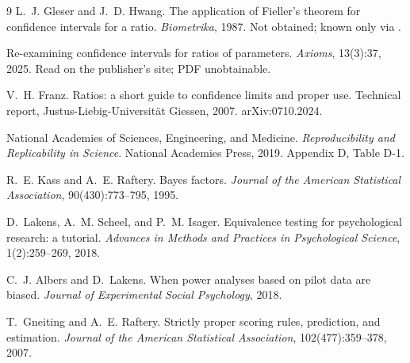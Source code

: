 \documentclass[10pt,twocolumn,letterpaper]{article}
\begin{document}
\begin{thebibliography}{9}
L.~J. Gleser and J.~D. Hwang.
The application of Fieller's theorem for confidence intervals for a ratio.
\emph{Biometrika}, 1987. Not obtained; known only via \cite{axioms2025}.

Re-examining confidence intervals for ratios of parameters.
\emph{Axioms}, 13(3):37, 2025. Read on the publisher's site; PDF unobtainable.

V.~H. Franz.
Ratios: a short guide to confidence limits and proper use.
Technical report, Justus-Liebig-Universit\"at Giessen, 2007. arXiv:0710.2024.

National Academies of Sciences, Engineering, and Medicine.
\emph{Reproducibility and Replicability in Science}. National Academies Press, 2019.
Appendix D, Table D-1.

R.~E. Kass and A.~E. Raftery.
Bayes factors.
\emph{Journal of the American Statistical Association}, 90(430):773--795, 1995.

D.~Lakens, A.~M. Scheel, and P.~M. Isager.
Equivalence testing for psychological research: a tutorial.
\emph{Advances in Methods and Practices in Psychological Science}, 1(2):259--269, 2018.

C.~J. Albers and D.~Lakens.
When power analyses based on pilot data are biased.
\emph{Journal of Experimental Social Psychology}, 2018.

T.~Gneiting and A.~E. Raftery.
Strictly proper scoring rules, prediction, and estimation.
\emph{Journal of the American Statistical Association}, 102(477):359--378, 2007.

\end{thebibliography}
\end{document}
